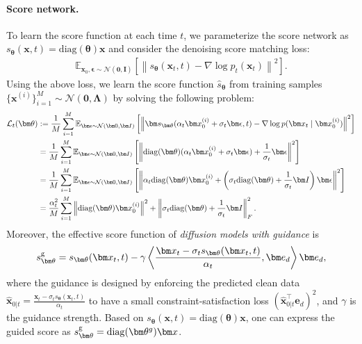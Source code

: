 \documentclass{article}
\theoremstyle{plain}
\theoremstyle{definition}
\theoremstyle{remark}
\newcommand{\E}{\mathbb{E}}
\begin{document}
\paragraph{Score network.} To learn the score function at each time $t$, we parameterize the score network as $s_{\bm \theta}(\bm x, t) = \mathrm{diag}(\bm \theta)\bm x$ and consider the denoising score matching loss:
\begin{align*}
    \E_{\bm x_0,\bm \epsilon \sim \mathcal{N}(\bm 0,\bm{I})}\left[ \left\|   s_{\bm \theta}(\bm x_t,t) - \nabla \log p_t(\bm x_t) \right\|^2\right].
\end{align*}
Using the above loss, we learn the score function $\hat{s}_{\bm \theta}$ from training samples $\{\bm x^{(i)}\}_{i=1}^M \sim \mathcal{N}(\bm 0, \bm \Lambda)$ by solving the following problem:
\begin{align}\label{eq:Lt}
        \mathcal{L}_t(\bm \theta) & := \frac{1}{M}\sum_{i=1}^M \E_{\bm \epsilon \sim \mathcal{N}(\bm 0, \bm I)}\left[ \left\| \bm s_{\bm \theta}(\alpha_t \bm x_0^{(i)} + \sigma_t \bm \epsilon,t) - \nabla \log p(\bm x_t \mid \bm x_0^{(i)}) \right\|^2\right] \notag\\
    & = \frac{1}{M}\sum_{i=1}^M  \E_{\bm \epsilon \sim \mathcal{N}(\bm 0, \bm I)}\left[ \left\|\mathrm{diag}(\bm \theta)(\alpha_t \bm x_0^{(i)} + \sigma_t \bm \epsilon) + \frac{1}{\sigma_t}\bm \epsilon\right\|^2  \right] \notag\\
        & = \frac{1}{M}\sum_{i=1}^M  \E_{\bm \epsilon \sim \mathcal{N}(\bm 0, \bm I)}\left[ \left\|\alpha_t\mathrm{diag}(\bm \theta)\bm x_0^{(i)} + \left(\sigma_t\mathrm{diag}(\bm \theta) + \frac{1}{\sigma_t}\bm I \right)\bm \epsilon\right\|^2 \right] \notag\\
    & = \frac{\alpha_t^2}{M}\sum_{i=1}^M\left\|\mathrm{diag}(\bm \theta)\bm x_0^{(i)}\right\|^2 + \left\|\sigma_t\mathrm{diag}(\bm \theta) + \frac{1}{\sigma_t}\bm I \right\|_F^2.
\end{align}
Moreover, the effective score function of {\em diffusion models with guidance} \cite{guo2024gradient} is
    \begin{align*}
        s^{\rm g}_{\bm \theta} = s_{\bm \theta}(\bm x_t, t) - \gamma \left\langle \frac{\bm x_t - \sigma_t s_{\bm \theta}(\bm x_t, t)}{\alpha_t}, \bm e_d\right\rangle  \bm e_d,
    \end{align*}
    where the guidance is designed by enforcing the predicted clean data $\hat {\bm x}_{0|t} =\frac{\bm x_t - \sigma_t s_{\bm \theta}(\bm x_t, t)}{\alpha_t} $  to have a small constraint-satisfaction loss $(\hat {\bm x}_{0|t}^\top\mathbf e_d)^2$, and $\gamma$ is the guidance strength. Based on $s_{\bm \theta}(\bm x, t) = \mathrm{diag}(\bm \theta)\bm x$, one can express the guided score as $s^{\rm g}_{\bm \theta} = \mathrm{diag}(\bm \theta^{g})\bm x$.
\end{document}
